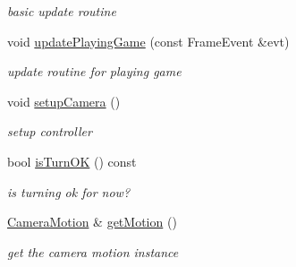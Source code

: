 \begin{DoxyCompactItemize}
\begin{DoxyCompactList}\small\item\em basic update routine \end{DoxyCompactList}\item 
void \hyperlink{class_n_c_t_u_camera_ae89905594734277ad03ece810a2044f5}{update\+Playing\+Game} (const Frame\+Event \&evt)\hypertarget{class_n_c_t_u_camera_ae89905594734277ad03ece810a2044f5}{}\label{class_n_c_t_u_camera_ae89905594734277ad03ece810a2044f5}

\begin{DoxyCompactList}\small\item\em update routine for playing game \end{DoxyCompactList}\item 
void \hyperlink{class_n_c_t_u_camera_a418e25bc4e93439e0f12fe1074af3fe7}{setup\+Camera} ()\hypertarget{class_n_c_t_u_camera_a418e25bc4e93439e0f12fe1074af3fe7}{}\label{class_n_c_t_u_camera_a418e25bc4e93439e0f12fe1074af3fe7}

\begin{DoxyCompactList}\small\item\em setup controller \end{DoxyCompactList}\item 
bool \hyperlink{class_n_c_t_u_camera_a68c20abf9dd120e315edd033175eef50}{is\+Turn\+OK} () const \hypertarget{class_n_c_t_u_camera_a68c20abf9dd120e315edd033175eef50}{}\label{class_n_c_t_u_camera_a68c20abf9dd120e315edd033175eef50}

\begin{DoxyCompactList}\small\item\em is turning ok for now? \end{DoxyCompactList}\item 
\hyperlink{class_camera_motion}{Camera\+Motion} \& \hyperlink{class_n_c_t_u_camera_a5925e054a060e69c5e252f1bbb63f5e5}{get\+Motion} ()\hypertarget{class_n_c_t_u_camera_a5925e054a060e69c5e252f1bbb63f5e5}{}\label{class_n_c_t_u_camera_a5925e054a060e69c5e252f1bbb63f5e5}

\begin{DoxyCompactList}\small\item\em get the camera motion instance \end{DoxyCompactList}\end{DoxyCompactItemize}
